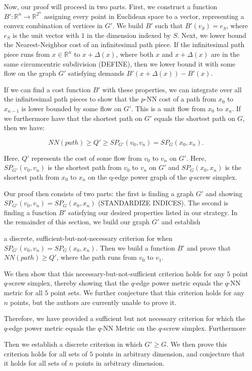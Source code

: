 
Now, our proof will proceed in two parts. First, we construct a function
$B':\mathbb{R}^n \rightarrow \mathbb{R}^{2^n}$ assigning every point in
Euclidean space to a vector, representing a convex combination of vertices in
$G'$. We build $B'$ such that $B'(v_S)= e_S$, where $e_S$ is the unit vector
with $1$ in the dimension indexed by $S$. Next, we lower bound the
Nearest-Neighbor cost of an infinitesimal path piece. If the infinitesimal path
piece runs from $x \in \mathbb{R}^n$ to $x+\Delta(x)$, where both $x$ and
$x+\Delta(x)$ are in the same circumcentric subdivision (DEFINE), then we lower
bound it with some flow on the graph $G'$ satisfying demands $B'(x+\Delta(x)) -
B'(x)$.

If we can find a cost function $B'$ with these properties, we can integrate
over all the infinitesimal path pieces to show that the $p$-NN cost of a path
from $x_0$ to $x_{n-1}$ is lower bounded by some flow on $G'$. This is a unit
flow from $x_0$ to $x_n$. If we furthermore have that the shortest path on $G'$
equals the shortest path on $G$, then we have:

$$NN(path) \geq Q' \geq SP_{G'}(v_0, v_n) = SP_{G}(x_0, x_n).$$

Here, $Q'$ represents the cost of some flow from $v_0$ to $v_n$ on $G'$. Here,
$SP_{G'}(v_0, v_n)$ is the shortest path from $v_0$ to $v_n$ on $G'$ and
$SP_G(x_0, x_n)$ is the shortest path from $x_0$ to $x_n$ on the q-edge power
graph of the $q$-screw simplex.

Our proof then consists of two parts: the first is finding a graph $G'$ and
showing $SP_{G'}(v_0, v_n) = SP_G(x_0, x_n)$ (STANDARDIZE INDICES). The second
is finding a function $B'$ satisfying our desired properties listed in our
strategy. In the remainder of this section, we build our graph $G'$ and
establish

a discrete, sufficient-but-not-necessary criterion for when $SP_{G'}(v_0, v_n)
= SP_G(x_0, x_n)$. Then we build a function $B'$ and prove that $NN(path) \geq
Q'$, where the path runs from $v_0$ to $v_1$.

We then show that this necessary-but-not-sufficient criterion holds for any $5$
point $q$-screw simplex, thereby showing that the $q$-edge power metric equals
the $q$-NN metric for all $5$ point sets. We further conjecture that this
criterion holds for any $n$ points, but the authors are currently unable to
prove it.

Therefore, we have provided a sufficient but not necessary criterion for which
the $q$-edge power metric equals the $q$-NN Metric on the $q$-screw simplex.
Furthermore

Then we establish a discrete criterion in which $G' \geq G$. We then prove this
criterion holds for all sets of $5$ points in arbitrary dimension, and
conjecture that it holds for all sets of $n$ points in arbitrary dimension.
